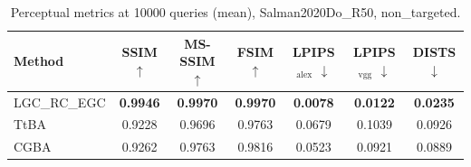 \begin{table}[t]
\centering\footnotesize
\caption{Perceptual metrics at 10000 queries (mean), Salman2020Do\_R50, non\_targeted.}
\begin{tabular}{lcccccc}
\toprule
Method & SSIM $\uparrow$ & MS-SSIM $\uparrow$ & FSIM $\uparrow$ & LPIPS$_{\mathrm{alex}}$ $\downarrow$ & LPIPS$_{\mathrm{vgg}}$ $\downarrow$ & DISTS $\downarrow$ \\
\midrule
LGC\_RC\_EGC & \textbf{0.9946} & \textbf{0.9970} & \textbf{0.9970} & \textbf{0.0078} & \textbf{0.0122} & \textbf{0.0235} \\
TtBA & 0.9228 & 0.9696 & 0.9763 & 0.0679 & 0.1039 & 0.0926 \\
CGBA & 0.9262 & 0.9763 & 0.9816 & 0.0523 & 0.0921 & 0.0889 \\
\bottomrule
\end{tabular}
\end{table}
